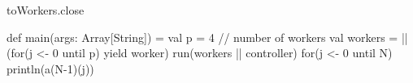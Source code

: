 \begin{question}
\begin{parts}
\begin{scala}
{{    toWorkers.close
  }

  def main(args: Array[String]) = { 
    val p = 4 // number of workers
    val workers = || (for(j <- 0 until p) yield worker)
    run(workers || controller)
    for(j <- 0 until N) println(a(N-1)(j))
  }
}
\end{scala}
\end{parts}
\end{question}
 
